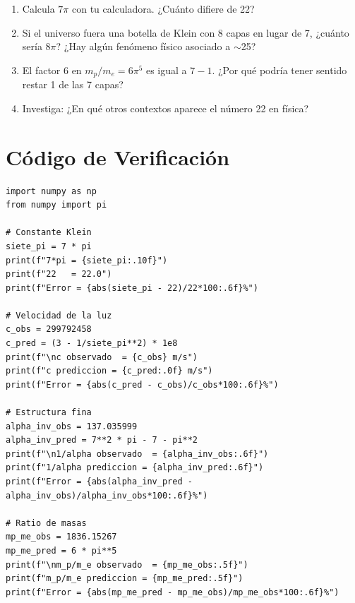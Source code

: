 \begin{enumerate}
    \item Calcula $7\pi$ con tu calculadora. ¿Cuánto difiere de 22?

    \item Si el universo fuera una botella de Klein con 8 capas en lugar de 7,
    ¿cuánto sería $8\pi$? ¿Hay algún fenómeno físico asociado a $\sim$25?

    \item El factor 6 en $m_p/m_e = 6\pi^5$ es igual a $7-1$.
    ¿Por qué podría tener sentido restar 1 de las 7 capas?

    \item Investiga: ¿En qué otros contextos aparece el número 22 en física?
\end{enumerate}


\section*{Código de Verificación}

\begin{lstlisting}[caption={Verificación numérica - Capítulo 1}]
import numpy as np
from numpy import pi

# Constante Klein
siete_pi = 7 * pi
print(f"7*pi = {siete_pi:.10f}")
print(f"22   = 22.0")
print(f"Error = {abs(siete_pi - 22)/22*100:.6f}%")

# Velocidad de la luz
c_obs = 299792458
c_pred = (3 - 1/siete_pi**2) * 1e8
print(f"\nc observado  = {c_obs} m/s")
print(f"c prediccion = {c_pred:.0f} m/s")
print(f"Error = {abs(c_pred - c_obs)/c_obs*100:.6f}%")

# Estructura fina
alpha_inv_obs = 137.035999
alpha_inv_pred = 7**2 * pi - 7 - pi**2
print(f"\n1/alpha observado  = {alpha_inv_obs:.6f}")
print(f"1/alpha prediccion = {alpha_inv_pred:.6f}")
print(f"Error = {abs(alpha_inv_pred - alpha_inv_obs)/alpha_inv_obs*100:.6f}%")

# Ratio de masas
mp_me_obs = 1836.15267
mp_me_pred = 6 * pi**5
print(f"\nm_p/m_e observado  = {mp_me_obs:.5f}")
print(f"m_p/m_e prediccion = {mp_me_pred:.5f}")
print(f"Error = {abs(mp_me_pred - mp_me_obs)/mp_me_obs*100:.6f}%")
\end{lstlisting}
